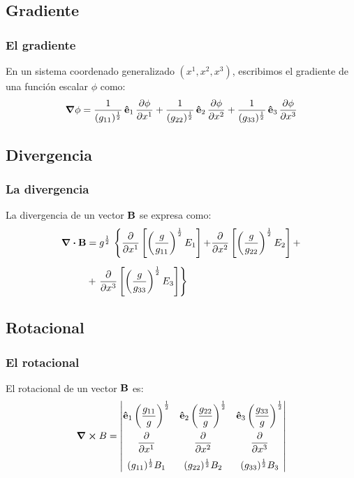 \documentclass[12pt]{beamer}
\begin{document}
\subsection{Gradiente}

\begin{frame}
\frametitle{El gradiente}
En un sistema coordenado generalizado $(x^{1}, x^{2}, x^{3})$, escribimos el gradiente de una función escalar $\phi$ como:
\pause
\begin{align*}
\grad{\phi} = \dfrac{1}{(g_{11})^{\frac{1}{2}}} \, \vu{e}_{1} \, \pdv{\phi}{x^{1}} + \dfrac{1}{(g_{22})^{\frac{1}{2}}} \, \vu{e}_{2} \, \pdv{\phi}{x^{2}} + \dfrac{1}{(g_{33})^{\frac{1}{2}}} \, \vu{e}_{3} \, \pdv{\phi}{x^{3}}
\end{align*}
\end{frame}

\subsection{Divergencia}

\begin{frame}
\frametitle{La divergencia}
La divergencia de un vector $\vb{B}$ se expresa como:
\pause
\begin{align*}
\div{\vb{B}} &= g^{\frac{1}{2}} \, \left\{ \pdv{x^{1}} \left[ \left( \dfrac{g}{g_{11}} \right)^{\frac{1}{2}} E_{1} \right] {+} \pdv{x^{2}} \left[ \left( \dfrac{g}{g_{22}} \right)^{\frac{1}{2}} E_{2} \right] + \right. \\[0.5em] 
&+ \left. \pdv{x^{3}} \left[ \left( \dfrac{g}{g_{33}} \right)^{\frac{1}{2}} E_{3} \right] \right\}
\end{align*}
\end{frame}

\subsection{Rotacional}

\begin{frame}
\frametitle{El rotacional}
El rotacional de un vector $\vb{B}$ es:
\pause
\begin{align*}
\curl{B} = \mqty|
\vu{e}_{1} \left( \dfrac{g_{11}}{g} \right)^{\frac{1}{2}} & \vu{e}_{2} \left( \dfrac{g_{22}}{g} \right)^{\frac{1}{2}} & \vu{e}_{3} \left( \dfrac{g_{33}}{g} \right)^{\frac{1}{2}} \\[1em]
\displaystyle \pdv{x^{1}} & \displaystyle \pdv{x^{2}} & \displaystyle \pdv{x^{3}} \\[1em]
(g_{11})^{\frac{1}{2}} B_{1} & (g_{22})^{\frac{1}{2}} B_{2} & (g_{33})^{\frac{1}{2}} B_{3}
|
\end{align*}
\end{frame}
\end{document}
